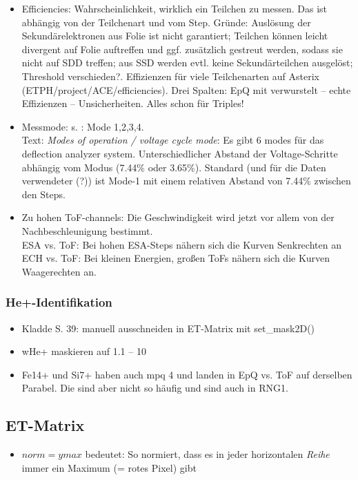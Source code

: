 \documentclass[]{article}
\begin{document}
\begin{itemize}
	\item Efficiencies: Wahrscheinlichkeit, wirklich ein Teilchen zu messen. Das ist abhängig von der Teilchenart und vom Step. Gründe: Auslösung der Sekundärelektronen aus Folie ist nicht garantiert; Teilchen können leicht divergent auf Folie auftreffen und ggf. zusätzlich gestreut werden, sodass sie nicht auf SDD treffen; aus SSD werden evtl. keine Sekundärteilchen ausgelöst; Threshold verschieden?. Effizienzen für viele Teilchenarten auf Asterix (ETPH/project/ACE/efficiencies). Drei Spalten: EpQ mit verwurstelt -- echte Effizienzen -- Unsicherheiten. Alles schon für Triples!
	\item Messmode: s. \citet{gloeckler_1992}: Mode 1,2,3,4. \\ 
	Text: \textit{Modes of operation / voltage cycle mode}: Es gibt 6 modes für das deflection analyzer system. Unterschiedlicher Abstand der Voltage-Schritte abhängig vom Modus (7.44\% oder 3.65\%). Standard (und für die Daten verwendeter (?)) ist Mode-1 mit einem relativen Abstand von 7.44\% zwischen den Steps.
	\item Zu hohen ToF-channels: Die Geschwindigkeit wird jetzt vor allem von der Nachbeschleunigung bestimmt. \\
	ESA vs. ToF: Bei hohen ESA-Steps nähern sich die Kurven Senkrechten an\\
	ECH vs. ToF: Bei kleinen Energien, großen ToFs nähern sich die Kurven Waagerechten an.
\end{itemize}
%
\subsubsection{He+-Identifikation}
\begin{itemize}
	\item Kladde S. 39: manuell ausschneiden in ET-Matrix mit set\_mask2D()
	\item wHe+ maskieren auf 1.1 -- 10 
	\item Fe14+ und Si7+ haben auch mpq 4 und landen in EpQ vs. ToF auf derselben Parabel. Die sind aber nicht so häufig und sind auch in RNG1.
\end{itemize}
%
%
%
\subsection{ET-Matrix}
\begin{itemize}
	\item $norm = ymax$ bedeutet: So normiert, dass es in jeder horizontalen \textit{Reihe} immer ein Maximum (= rotes Pixel) gibt
\end{itemize}
\end{document}
